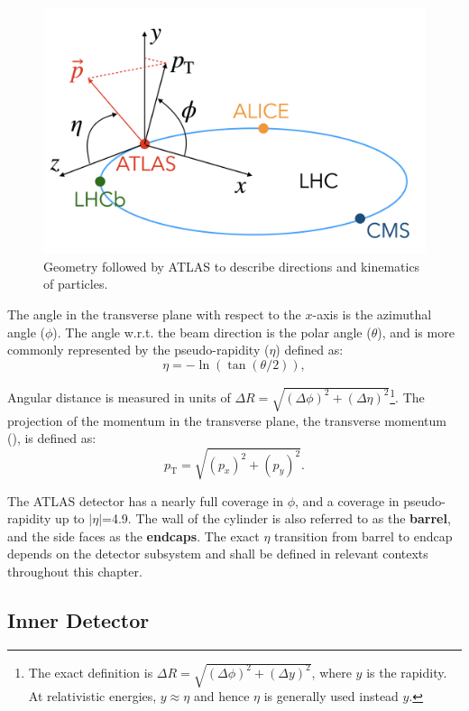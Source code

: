 \begin{figure}[!ht]
    \centering
    \includegraphics[width=0.7\linewidth]{figures/experiment/geometry.png}
    \caption{Geometry followed by ATLAS to describe directions and kinematics of particles.}
    \label{fig:geo}
\end{figure}

The angle in the transverse plane with respect to the $x$-axis is the azimuthal angle ($\phi$). The angle w.r.t. the beam direction is the polar angle ($\theta$), and is more commonly represented by the pseudo-rapidity ($\eta$) defined as:
\begin{equation}
    \eta = -\ln (\tan (\theta/2)),
\end{equation}

Angular distance is measured in units of $\Delta R = \sqrt{(\Delta\phi)^2 + (\Delta\eta)^2}$\footnote{The exact definition is $\Delta R = \sqrt{(\Delta\phi)^2 + (\Delta y)^2}$, where $y$ is the rapidity. At relativistic energies, $y\approx \eta$ and hence $\eta$ is generally used instead $y$.}. The projection of the momentum in the transverse plane, the transverse momentum (\pT), is defined as:
\begin{equation}
    p_\mathrm{T} = \sqrt{(p_x)^2 + (p_y)^2}.
\end{equation}

The ATLAS detector has a nearly full coverage in $\phi$, and a coverage in pseudo-rapidity up to $|\eta|$=4.9. The wall of the cylinder is also referred to as the \textbf{barrel}, and the side faces as the \textbf{endcaps}. The exact $\eta$ transition from barrel to endcap depends on the detector subsystem and shall be defined in relevant contexts throughout this chapter.

\subsection{Inner Detector}

